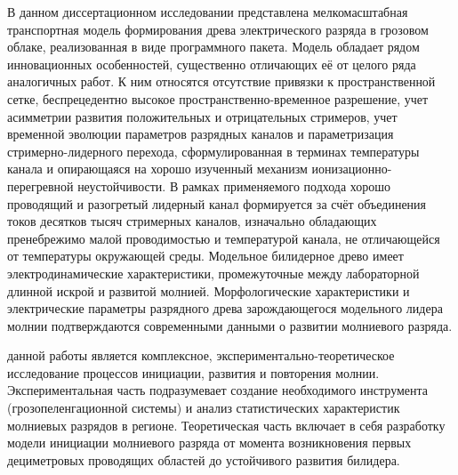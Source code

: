 В данном диссертационном исследовании представлена мелкомасштабная транспортная модель формирования древа электрического разряда в грозовом облаке, реализованная в виде программного пакета. Модель обладает рядом инновационных особенностей, существенно отличающих её от целого ряда аналогичных работ. К ним относятся отсутствие привязки к пространственной сетке, беспрецедентно высокое пространственно-временное разрешение, учет асимметрии развития положительных и отрицательных стримеров, учет временной эволюции параметров разрядных каналов и параметризация стримерно-лидерного перехода, сформулированная в терминах температуры канала и опирающаяся на хорошо изученный механизм ионизационно-перегревной неустойчивости. В рамках применяемого подхода хорошо проводящий и разогретый лидерный канал формируется за счёт объединения токов десятков тысяч стримерных каналов, изначально обладающих пренебрежимо малой проводимостью и температурой канала, не отличающейся от температуры окружающей среды. Модельное билидерное древо имеет электродинамические характеристики, промежуточные между лабораторной длинной искрой и развитой молнией. Морфологические характеристики и электрические параметры разрядного древа зарождающегося модельного лидера молнии подтверждаются современными данными о развитии молниевого разряда.



{\aim} данной работы является комплексное, экспериментально-теоретическое исследование процессов инициации, развития и повторения молнии. Экспериментальная часть подразумевает создание необходимого инструмента (грозопеленгационной системы) и анализ статистических характеристик молниевых разрядов в регионе. Теоретическая часть включает в себя разработку модели инициации молниевого разряда от момента возникновения первых дециметровых проводящих областей до устойчивого развития билидера.

